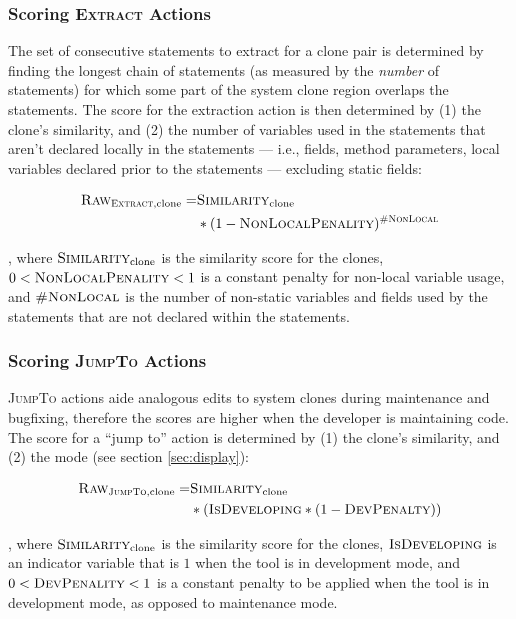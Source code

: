 \documentclass[nocopyrightspace,10pt]{sigplanconf}
\begin{document}
\subsubsection{Scoring \textsc{Extract} Actions}
\label{sec:extract}
The set of consecutive statements to extract for a clone pair is
determined by finding the longest chain of statements (as measured by
the \textit{number} of statements) for which some part of the system
clone region overlaps the statements.  The score for the extraction
action is then determined by (1) the clone's similarity, and (2) the
number of variables used in the statements that aren't declared
locally in the statements --- i.e., fields, method parameters, local
variables declared prior to the statements --- excluding static
fields:

\begin{align*}
  \textsc{Raw}_{\textsc{Extract}, \text{clone}} = & \textsc{Similarity}_{\text{clone}} \\ 
   & * (1 - \textsc{NonLocalPenality})^{\textsc{\#NonLocal}}
\end{align*}

\noindent, where $\textsc{Similarity}_{\text{clone}}$ is the
similarity score for the clones, $0 < \textsc{NonLocalPenality} < 1$
is a constant penalty for non-local variable usage, and
$\textsc{\#NonLocal}$ is the number of non-static variables and fields
used by the statements that are not declared within the statements.

\subsubsection{Scoring \textsc{JumpTo} Actions}
\textsc{JumpTo} actions aide analogous edits to system clones
during maintenance and bugfixing, therefore the scores are higher when
the developer is maintaining code. The score for a ``jump to'' action
is determined by (1) the clone's similarity, and (2) the mode (see
section \ref{sec:display}):

\begin{align*}
  \textsc{Raw}_{\textsc{JumpTo}, \text{clone}} = & \textsc{Similarity}_{\text{clone}} \\ 
   & * (\textsc{IsDeveloping} * (1 - \textsc{DevPenalty}))
\end{align*}

\noindent, where $\textsc{Similarity}_{\text{clone}}$ is the
similarity score for the clones, $\textsc{IsDeveloping}$ is an
indicator variable that is $1$ when the tool is in development mode,
and $0 < \textsc{DevPenality} < 1$ is a constant penalty to be applied
when the tool is in development mode, as opposed to maintenance mode.
\end{document}
